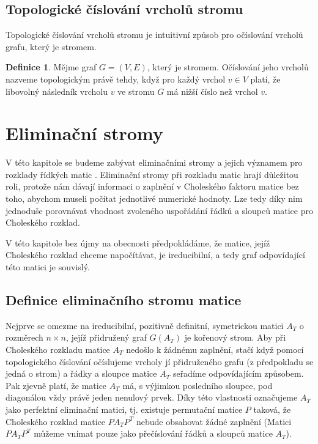 \documentclass{ctuthesis}
\theoremstyle{plain}
\theoremstyle{definition}
\newtheorem{definition}{Definice}
\begin{document}
\subsection{Topologické číslování vrcholů stromu}
Topologické číslování vrcholů stromu je intuitivní způsob pro očíslování vrcholů grafu, který je stromem.
\begin{definition}
    Mějme graf $G = (V,E)$, který je stromem. Očíslování jeho vrcholů nazveme topologickým právě tehdy,
    když pro každý vrchol $v \in V$ platí, že libovolný následník vrcholu $v$ ve stromu $G$ má nižší číslo než vrchol $v$.
\end{definition}


\section{Eliminační stromy}
\label{eltreeChapter}

V této kapitole se budeme zabývat eliminačními stromy a jejich významem pro rozklady řídkých matic \cite{liu:86,liu:90}. Eliminační stromy při rozkladu matic hrají důležitou roli, protože nám dávají informaci o zaplnění v Choleského faktoru matice bez toho, abychom museli počítat jednotlivé numerické hodnoty. Lze tedy díky nim jednoduše porovnávat vhodnost zvoleného uspořádání řádků a sloupců matice pro Choleského rozklad.

V této kapitole bez újmy na obecnosti předpokládáme, že matice, jejíž Choleského rozklad chceme napočítávat, je ireducibilní, a tedy graf odpovídající této matici je souvislý.

\subsection{Definice eliminačního stromu matice}

Nejprve se omezme na ireducibilní, pozitivně definitní, symetrickou matici $A_T$ o rozměrech $n \times n$, jejíž přidružený graf $G(A_T)$ je kořenový strom. Aby při Choleského rozkladu matice $A_T$ nedošlo k žádnému zaplnění, stačí když pomocí topologického číslování očíslujeme vrcholy jí přidruženého grafu (z předpokladu se jedná o strom) a řádky a sloupce matice $A_T$ seřadíme odpovídajícím způsobem. Pak zjevně platí, že matice $A_T$ má, s výjimkou posledního sloupce, pod diagonálou vždy právě jeden nenulový prvek. Díky této vlastnosti označujeme $A_T$ jako perfektní eliminační matici, tj. existuje permutační matice $P$ taková, že Choleského rozklad matice $PA_TP^T$ nebude obsahovat žádné zaplnění \cite{rose:72} (Matici $PA_TP^T$ můžeme vnímat pouze jako přečíslování řádků a sloupců matice $A_T$). 
\end{document}

